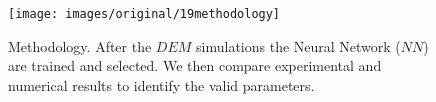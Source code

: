 \begin{figure}[!htb] 
\centering 
\texttt{[image: images/original/19methodology]} 
\caption[Methodology]{Methodology. After the $DEM$ simulations the Neural
Network ($NN$) are trained and selected. We then compare experimental and
numerical results to identify the valid parameters.}
\label{fig:19methodology} 
\end{figure}


